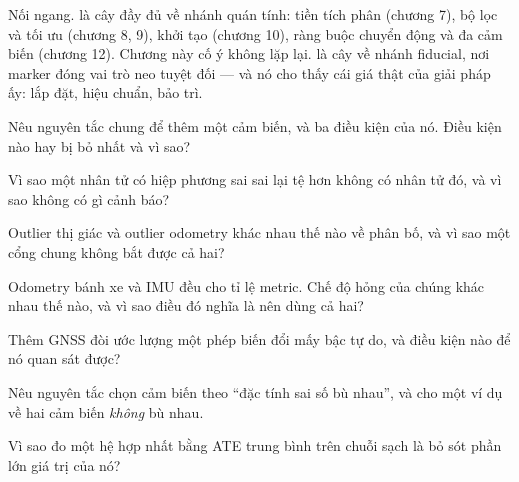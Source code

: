 \documentclass[../../vslam.tex]{subfiles}
\begin{document}
Nối ngang.  là cây đầy đủ về nhánh quán tính: tiền tích phân (chương 7), bộ lọc và tối ưu (chương 8, 9), khởi tạo (chương 10), ràng buộc chuyển động và đa cảm biến (chương 12). Chương này cố ý không lặp lại.  là cây về nhánh fiducial, nơi marker đóng vai trò neo tuyệt đối --- và nó cho thấy cái giá thật của giải pháp ấy: lắp đặt, hiệu chuẩn, bảo trì.

\begin{tukiem}
\item Nêu nguyên tắc chung để thêm một cảm biến, và ba điều kiện của nó. Điều kiện nào hay bị bỏ nhất và vì sao?
\item Vì sao một nhân tử có hiệp phương sai sai lại tệ hơn không có nhân tử đó, và vì sao không có gì cảnh báo?
\item Outlier thị giác và outlier odometry khác nhau thế nào về phân bố, và vì sao một cổng chung không bắt được cả hai?
\item Odometry bánh xe và IMU đều cho tỉ lệ metric. Chế độ hỏng của chúng khác nhau thế nào, và vì sao điều đó nghĩa là nên dùng cả hai?
\item Thêm GNSS đòi ước lượng một phép biến đổi mấy bậc tự do, và điều kiện nào để nó quan sát được?
\item Nêu nguyên tắc chọn cảm biến theo ``đặc tính sai số bù nhau'', và cho một ví dụ về hai cảm biến \emph{không} bù nhau.
\item Vì sao đo một hệ hợp nhất bằng ATE trung bình trên chuỗi sạch là bỏ sót phần lớn giá trị của nó?
\end{tukiem}
\ifSubfilesClassLoaded{\printbibliography[title={Nguồn}]}{}
\end{document}
